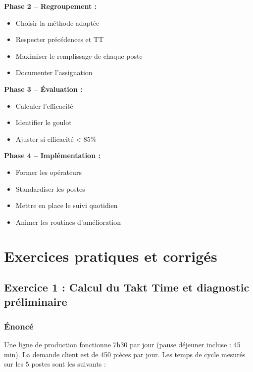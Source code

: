 \documentclass[12pt,a4paper]{article}
\begin{document}
\begin{center}
\textbf{Phase 2 – Regroupement :}
\begin{itemize}
    \item Choisir la méthode adaptée
    \item Respecter précédences et TT
    \item Maximiser le remplissage de chaque poste
    \item Documenter l’assignation
\end{itemize}

\textbf{Phase 3 – Évaluation :}
\begin{itemize}
    \item Calculer l’efficacité
    \item Identifier le goulot
    \item Ajuster si efficacité < 85\%
\end{itemize}

\textbf{Phase 4 – Implémentation :}
\begin{itemize}
    \item Former les opérateurs
    \item Standardiser les postes
    \item Mettre en place le suivi quotidien
    \item Animer les routines d’amélioration
\end{itemize}


\section{Exercices pratiques et corrigés}

\subsection{Exercice 1 : Calcul du Takt Time et diagnostic préliminaire}
\subsubsection{Énoncé}
Une ligne de production fonctionne 7h30 par jour (pause déjeuner incluse : 45 min). La demande client est de 450 pièces par jour. Les temps de cycle mesurés sur les 5 postes sont les suivants :


\end{center}
\end{document}
